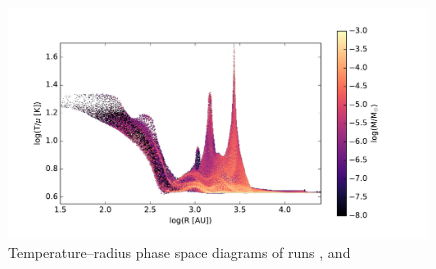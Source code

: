 \begin{figure}[!htb]
 \includegraphics[width=0.99\textwidth]{Figures/var_rt_larson_plots/temp_R_hist_n1c1}
 \captionsetup{justification=justified,singlelinecheck=false,width=\linewidth}
 \decoRule
 \caption[ T--R phase diagrams]{Temperature--radius phase space diagrams of runs ,  and }
\label{fig:c1.0_T_R_larson}
\end{figure}
\FloatBarrier


